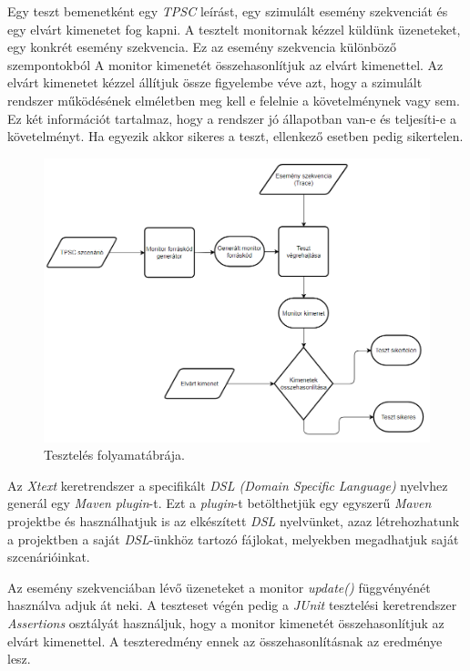 Egy teszt bemenetként egy \textit{TPSC} leírást, egy szimulált esemény szekvenciát és egy elvárt kimenetet fog kapni.
A tesztelt monitornak kézzel küldünk üzeneteket, egy konkrét esemény szekvencia.
Ez az esemény szekvencia különböző szempontokból
A monitor kimenetét összehasonlítjuk az elvárt kimenettel.
Az elvárt kimenetet kézzel állítjuk össze figyelembe véve azt, hogy a szimulált rendszer működésének elméletben meg kell e felelnie a követelménynek vagy sem.
Ez két információt tartalmaz, hogy a rendszer jó állapotban van-e és teljesíti-e a követelményt.
Ha egyezik akkor sikeres a teszt, ellenkező esetben pedig sikertelen.

\begin{figure}[!ht]
    \centering
    \includegraphics[width=160mm, keepaspectratio]{figures/test_flowchart.png}
    \caption{Tesztelés folyamatábrája.}
    \label{testing_figure}
\end{figure}

Az \textit{Xtext} keretrendszer a specifikált \textit{DSL (Domain Specific Language)} nyelvhez generál egy \textit{Maven} \cite{Maven} \textit{plugin}-t.
Ezt a \textit{plugin}-t betölthetjük egy egyszerű \textit{Maven} projektbe és használhatjuk is az elkészített \textit{DSL} nyelvünket, azaz létrehozhatunk a projektben a saját \textit{DSL}-ünkhöz tartozó fájlokat, melyekben megadhatjuk saját szcenárióinkat.

Az esemény szekvenciában lévő üzeneteket a monitor \textit{update()} függvényénét használva adjuk át neki.
A teszteset végén pedig a \textit{JUnit} tesztelési keretrendszer \textit{Assertions} osztályát használjuk, hogy a monitor kimenetét összehasonlítjuk az elvárt kimenettel.
A teszteredmény ennek az összehasonlításnak az eredménye lesz.

